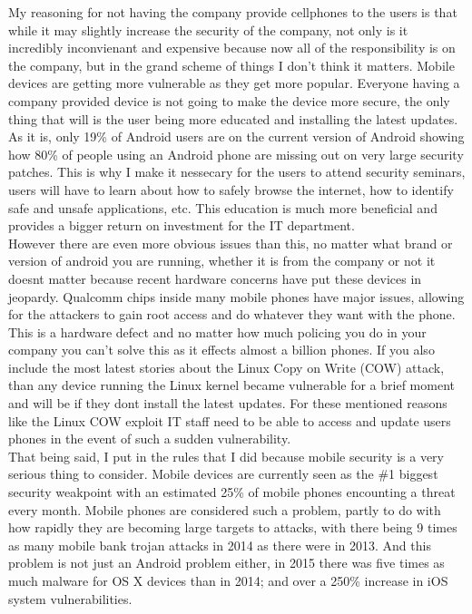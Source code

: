 \documentclass[a4paper, 11pt]{article}
\begin{document}
My reasoning for not having the company provide cellphones to the users is that while it may slightly increase the security of the company, not only is it incredibly inconvienant and expensive because now all of the responsibility is on the company, but in the grand scheme of things I don't think it matters.  Mobile devices are getting more vulnerable as they get more popular.  Everyone having a company provided device is not going to make the device more secure, the only thing that will is the user being more educated and installing the latest updates.  As it is, only 19\% of Android users are on the current version of Android showing how 80\% of people using an Android phone are missing out on very large security patches.  This is why I make it nessecary for the users to attend security seminars, users will have to learn about how to safely browse the internet, how to identify safe and unsafe applications, etc.  This education is much more beneficial and provides a bigger return on investment for the IT department.\\

However there are even more obvious issues than this, no matter what brand or version of android you are running, whether it is from the company or not it doesnt matter because recent hardware concerns have put these devices in jeopardy.  Qualcomm chips inside many mobile phones have major issues, allowing for the attackers to gain root access and do whatever they want with the phone.  This is a hardware defect and no matter how much policing you do in your company you can't solve this as it effects almost a billion phones.  If you also include the most latest stories about the Linux Copy on Write (COW) attack, than any device running the Linux kernel became vulnerable for a brief moment and will be if they dont install the latest updates.  For these mentioned reasons like the Linux COW exploit IT staff need to be able to access and update users phones in the event of such a sudden vulnerability.\\

That being said, I put in the rules that I did because mobile security is a very serious thing to consider.  Mobile devices are currently seen as the \#1 biggest security weakpoint with an estimated 25\% of mobile phones encounting a threat every month.  Mobile phones are considered such a problem, partly to do with how rapidly they are becoming large targets to attacks, with there being 9 times as many mobile bank trojan attacks in 2014 as there were in 2013.  And this problem is not just an Android problem either, in 2015 there was five times as much malware for OS X devices than in 2014; and over a 250\% increase in iOS system vulnerabilities.\\
\end{document}
